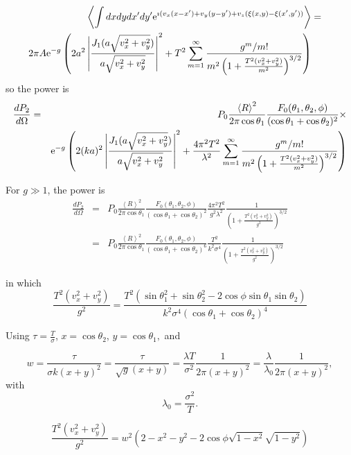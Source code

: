 \documentclass[11pt]{article}
\newcommand{\der}[2]{\frac{d {#1}}{d {#2}}}
\newcommand{\e}{{\rm e}}
\begin{document}
{{{{\begin{eqnarray}
\left<\int dx dydx'dy'\e^{\imath( v_{x}(x-x')+v_{y}(y-y')+v_{z}(\xi(x,y)-\xi(x',y'))}\right>&=&\\
2\pi A\e^{-g}\left(2a^{2}\left|\frac{J_{1}(a\sqrt{v_{x}^{2}+v_{y}^{2}})}{a\sqrt{v_{x}^{2}+v_{y}^{2}}}\right|^{2}+T^{2}\sum_{m=1}^{\infty}\frac{g^{m}/m!}{m^{2}\left(1+\frac{T^{2}(v_{x}^{2}+v_{y}^{2})}{m^{2}}\right)^{3/2}}\right)\end{eqnarray}
so the power is
\begin{eqnarray}
\der{P_{2}}{\Omega}&=&P_{0}\frac{\left<R\right>^{2}}{2\pi\cos\theta_{1}}\frac{F_{0}(\theta_{1},\theta_{2},\phi)}{(\cos{\theta_{1}}+\cos{\theta_{2}})^{2}}\times\\
&&\e^{-g}\left(2(ka)^{2}\left|\frac{J_{1}(a\sqrt{v_{x}^{2}+v_{y}^{2}})}{a\sqrt{v_{x}^{2}+v_{y}^{2}}}\right|^{2}+\frac{4\pi^{2}T^{2}}{\lambda^{2}}\sum_{m=1}^{\infty}\frac{g^{m}/m!}{m^{2}\left(1+\frac{T^{2}(v_{x}^{2}+v_{y}^{2})}{m^{2}}\right)^{3/2}}\right)\end{eqnarray}


For $g\gg 1$, the power is
\begin{eqnarray}
\der{P_{2}}{\Omega}&=&P_{0}\frac{\left<R\right>^{2}}{2\pi\cos\theta_{1}}\frac{F_{0}(\theta_{1},\theta_{2},\phi)}{(\cos{\theta_{1}}+\cos{\theta_{2}})^{2}}\frac{4\pi^{2}T^{2}}{g^{2}\lambda^{2}}\frac{1}{\left(1+\frac{T^{2}(v_{x}^{2}+v_{y}^{2})}{g^{2}}\right)^{3/2}}\\&=&
P_{0}\frac{\left<R\right>^{2}}{2\pi\cos\theta_{1}}\frac{F_{0}(\theta_{1},\theta_{2},\phi)}{(\cos{\theta_{1}}+\cos{\theta_{2}})^{6}}\frac{T^{2}}{k^{2}\sigma^{4}}\frac{1}{\left(1+\frac{T^{2}(v_{x}^{2}+v_{y}^{2})}{g^{2}}\right)^{3/2}}
\end{eqnarray}

in which
$$\frac{T^{2}(v_{x}^{2}+v_{y}^{2})}{g^{2}}=\frac{T^{2}\left(\sin\theta_{1}^{2}+\sin\theta_{2}^{2}-2\cos\phi\sin\theta_{1}\sin\theta_{2}\right)}{k^{2}\sigma^{4}(\cos{\theta_{1}}+\cos{\theta_{2}})^{4}}$$

Using $\tau=\frac{T}{\sigma}$, $x=\cos\theta_{2}$, $y=\cos\theta_{1},$ and

$$w=\frac{\tau}{\sigma k(x+y)^{2}}=\frac{\tau}{\sqrt{g}(x+y)}=\frac{\lambda T}{\sigma^{2}}\frac{1}{2\pi(x+y)^{2}}=\frac{\lambda}{\lambda_{0}}\frac{1}{2\pi(x+y)^{2}},$$
with
$$\lambda_{0}=\frac{\sigma^{2}}{T}.$$


$$\frac{T^{2}(v_{x}^{2}+v_{y}^{2})}{g^{2}}=w^{2}\left(2-x^{2}-y^{2}-2\cos\phi\sqrt{1-x^{2}}\sqrt{1-y^{2}}\right)$$

}}}}
\end{document}
